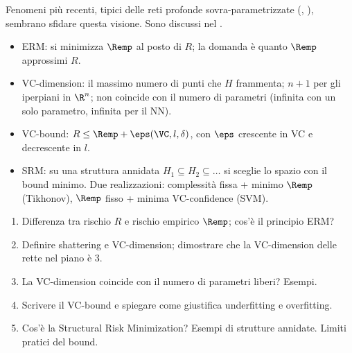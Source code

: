 \begin{attenzione}
Fenomeni più recenti, tipici delle reti profonde sovra-parametrizzate (,
), sembrano sfidare questa visione. Sono discussi nel .
\end{attenzione}

\begin{puntichiave}
\begin{itemize}
  \item ERM: si minimizza $\Remp$ al posto di $R$; la domanda è quanto $\Remp$ approssimi $R$.
  \item VC-dimension: il massimo numero di punti che $H$ frammenta; $n+1$ per gli iperpiani in $\R^n$; non
        coincide con il numero di parametri (infinita con un solo parametro, infinita per il NN).
  \item VC-bound: $R\le\Remp+\eps(\VC,l,\delta)$, con $\eps$ crescente in VC e decrescente in $l$.
  \item SRM: su una struttura annidata $H_1\subseteq H_2\subseteq\dots$ si sceglie lo spazio con il bound
        minimo. Due realizzazioni: complessità fissa + minimo $\Remp$ (Tikhonov), $\Remp$ fisso + minima
        VC-confidence (SVM).
\end{itemize}
\end{puntichiave}

\begin{domande}
\begin{enumerate}
  \item Differenza tra rischio $R$ e rischio empirico $\Remp$; cos'è il principio ERM?
  \item Definire shattering e VC-dimension; dimostrare che la VC-dimension delle rette nel piano è 3.
  \item La VC-dimension coincide con il numero di parametri liberi? Esempi.
  \item Scrivere il VC-bound e spiegare come giustifica underfitting e overfitting.
  \item Cos'è la Structural Risk Minimization? Esempi di strutture annidate. Limiti pratici del bound.
\end{enumerate}
\end{domande}
